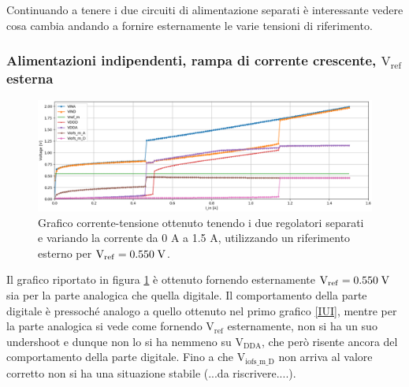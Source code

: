 Continuando a tenere i due circuiti di alimentazione separati è interessante vedere cosa cambia andando a fornire esternamente le varie tensioni di riferimento.

\subsubsection{Alimentazioni indipendenti, rampa di corrente crescente, $\mathrm{V_{ref}}$ esterna} 
\begin{figure}
\centering
\includegraphics[width=\textwidth]{Immagini/IUEVref2}
\caption{Grafico corrente-tensione ottenuto tenendo i due regolatori separati e variando la corrente da 0 A a 1.5 A, utilizzando un riferimento esterno per $\mathrm{V_{ref}}=0.550 \rm \; V$.}
\label{IUEVref}
\end{figure}
Il grafico riportato in figura \ref{IUEVref} è ottenuto fornendo esternamente  $\mathrm{V_{ref}}=0.550 \rm \; V$  sia per la parte analogica che quella digitale. Il comportamento della parte digitale è pressoché analogo a quello ottenuto nel primo grafico \ref{IUI}, mentre per la parte analogica si vede come fornendo $\mathrm{V_{ref}}$ esternamente, non si ha un suo undershoot e dunque non lo si ha nemmeno su $\mathrm{V_{DDA}}$, che però risente ancora del comportamento della parte digitale. Fino a che $\mathrm{V_{iofs\_ m \_ D}}$ non arriva al valore corretto non si ha una situazione stabile (...da riscrivere....).

% 
%
%

